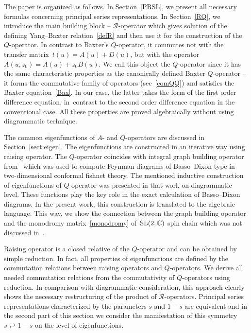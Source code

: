 \documentclass[pdftex]{sigma}
\numberwithin{equation}{section}
\begin{document}
The paper is organized as follows.
In Section~\ref{PRSL}, we present all necessary formulas concerning
principal series representations.
In Section~\ref{RQ}, we introduce the main building block --
$\mathcal{R}$-operator which gives solution of the defining
Yang--Baxter relation~\eqref{defR} and then use it for the
construction of the $Q$-operator.
In contrast to Baxter's $Q$-operator, it commutes not with the transfer matrix~$t(u)=A(u)+D(u)$, but with the operator $A(u,z_0)=A(u)+z_0 B(u)$.
We call this object the $Q$-operator since it has the same characteristic properties as the canonically defined Baxter $Q$-operator -- it forms the commutative family of operators (see~\eqref{comQQ}) and satisfies the Baxter equation~\eqref{Bax}.
In our case, the latter takes the form of the first order difference equation, in~contrast to the second order difference equation in the conventional case.
All these properties are proved algebraically without
using diagrammatic technique.

The common eigenfunctions of $A$- and $Q$-operators are discussed
in Section~\ref{sect:eigen}.
The eigenfunctions are constructed in an iterative way using raising
operator.
The $Q$-operator coincides with integral graph building operator from~\cite{DKO} which was used to compute Feynman diagrams of Basso--Dixon type in two-dimensional conformal fishnet theory.
The mentioned inductive construction of eigenfunctions of $Q$-operator was presented in that work on diagrammatic level. These functions play the key role in the exact calculation of Basso--Dixon diagrams.
In the present work, this construction is translated to the algebraic language.
This way, we show the connection between the graph building operator and the monodromy matrix~\eqref{monodromy} of~${\rm SL}(2,\mathbb{C})$ spin chain which was not discussed in~\cite{DKO}.

Raising operator is a closed relative of the $Q$-operator and
can be obtained by simple reduction.
In fact, all properties of eigenfunctions are defined by the commutation
relations between raising operators and $Q$-operators.
We derive all needed commutation relations from the commutativity
of $Q$-operators using reduction.
In comparison with diagrammatic consideration, this approach
clearly shows the necessary restructuring of the product of
$\mathcal{R}$-operators.
Principal series representations characterized by the
parameters $s$ and $1-s$ are equivalent and in the second part of this section
we consider the manifestation of this symmetry $s \rightleftarrows 1-s$ on the
level of eigenfunctions.
\end{document}
